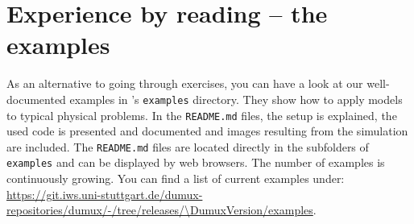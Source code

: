 \section{Experience \Dumux by reading -- the \Dumux examples}
As an alternative to going through exercises, you can have a look at our well-documented \Dumux examples in \Dumux's \texttt{examples} directory. They show how to apply \Dumux models to typical physical problems. In the \texttt{README.md} files, the setup is explained, the used code is presented and documented and images resulting from the simulation are included. The \texttt{README.md} files are located directly in the subfolders of \texttt{examples} and can be displayed by web browsers. The number of examples is continuously growing.
You can find a list of current examples under: \url{https://git.iws.uni-stuttgart.de/dumux-repositories/dumux/-/tree/releases/\DumuxVersion/examples}.
